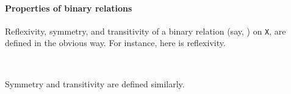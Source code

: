 \documentclass[a4paper,USenglish,cleveref,autoref,thm-restate]{lipics-v2019}
\begin{document}
\paragraph*{Properties of binary relations}\label{sec:properties-of-binary-relations}
Reflexivity, symmetry, and transitivity of a binary relation (say, \texttt{\Aapprox }) on \texttt{X}, are defined in the obvious way. For instance, here is reflexivity.
\begin{code}
\>[0]\AgdaSpace{}%
\AgdaSymbol{:}\AgdaSpace{}%
\AgdaSymbol{\{}\AgdaSpace{}%
\AgdaSymbol{:}\AgdaSpace{}%
\AgdaSpace{}%
\AgdaSpace{}%
\AgdaSymbol{\}}\AgdaSpace{}%
\AgdaSpace{}%
\AgdaSpace{}%
\AgdaSpace{}%
\AgdaSpace{}%
\AgdaSpace{}%
\AgdaSpace{}%
\AgdaSpace{}%
\AgdaSpace{}%
\<%
\\
\>[0]\AgdaSpace{}%
\AgdaOperator{\AgdaBound{\AgdaUnderscore{}\Aapprox \AgdaUnderscore{}}}\AgdaSpace{}%
\AgdaSymbol{=}\AgdaSpace{}%
\AgdaSpace{}%
\AgdaSpace{}%
\AgdaSpace{}%
\AgdaSpace{}%
\AgdaOperator{\AgdaBound{\Aapprox }}\AgdaSpace{}%
\<%
\end{code}
Symmetry and transitivity are defined similarly.
\end{document}
